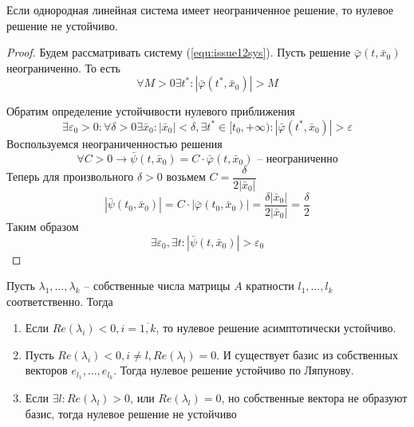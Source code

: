 \documentclass[a4paper, 12pt]{article}
\begin{document}
	\begin{lemma}
		Если однородная линейная система имеет неограниченное решение, то нулевое решение не устойчиво.
	\end{lemma}

	\begin{proof}
		Будем рассматривать систему (\ref{equ:issue12sys}). Пусть решение $\bar{\varphi}(t, \bar{x}_0)$ неограниченно. То есть 
		\[
			\forall M>0 \exists t^*:|\bar{\varphi}(t^*, \bar{x}_0)|>M
		\]
		
		Обратим определение устойчивости нулевого приближения 
		\[
			\exists \varepsilon_0>0: \forall \delta>0 \exists \bar{x}_0: |\bar{x}_0|<\delta, \exists t^*\in[t_0, +\infty): |\bar{\varphi}(t^*, \bar{x}_0)|>\varepsilon
		\]
		Воспользуемся неограниченностью решения
		\[
			\forall C>0 \to \bar{\psi}(t, \bar{x}_0) = C\cdot\bar{\varphi}(t, \bar{x}_0) \text{ -- неограниченно} 
		\]
		Теперь для произвольного $\delta >0 $ возьмем $C = \dfrac{\delta}{2|\bar{x}_0|}$
		\[
			|\bar{\psi}(t_0, \bar{x}_0)| = C\cdot|\bar{\varphi}(t_0, \bar{x}_0)| = \frac{\delta |\bar{x}_0|}{2|\bar{x}_0|} = \frac{\delta}{2}
		\]
		Таким образом
		\[
			\exists \varepsilon_0, \exists t: 	|\bar{\psi}(t, \bar{x}_0)| > \varepsilon_0
		\]
	\end{proof}
	
	\begin{theorem}
		Пусть $\lambda_1, \dots, \lambda_k$ -- собственные числа матрицы $A$ кратности $l_1, \dots, l_k$ соответственно. Тогда
		\begin{enumerate}
			\item Если $Re(\lambda_i)<0, i=\overline{1, k}$, то нулевое решение асимптотически устойчиво.
			\item Пусть $Re(\lambda_i)<0, i\neq l, Re(\lambda_l)=0$. И существует базис из собственных векторов $e_{l_1}, \dots, e_{l_k}$. Тогда нулевое решение устойчиво по Ляпунову.
			\item Если $\exists l: Re(\lambda_l) > 0$, или $Re(\lambda_l) = 0$, но собственные вектора не образуют базис, тогда нулевое решение не устойчиво
		\end{enumerate}
	\end{theorem}
	
\end{document}
